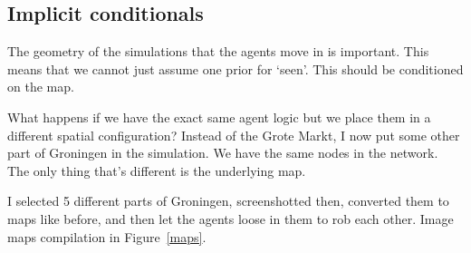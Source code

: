 \subsection{Implicit conditionals}

The geometry of the simulations that the agents move in is important. This means that we cannot just assume one prior for `seen'. This should be conditioned on the map.

What happens if we have the exact same agent logic but we place them in a different spatial configuration? Instead of the Grote Markt, I now put some other part of Groningen in the simulation. We have the same nodes in the network. The only thing that's different is the underlying map.

I selected 5 different parts of Groningen, screenshotted then, converted them to maps like before, and then let the agents loose in them to rob each other. Image maps compilation in Figure~\ref{maps}.

